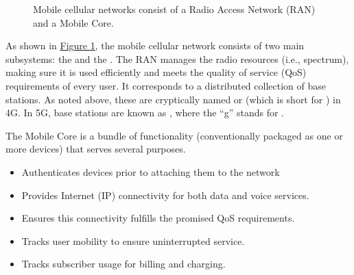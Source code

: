 \documentclass[a4paper,11pt,english]{sphinxmanual}
\let\sphinxpxdimen\pdfpxdimen\else\newdimen\sphinxpxdimen
\begin{document}
\begin{figure}[ht]
\centering
\capstart

\noindent\sphinxincludegraphics[width=600\sphinxpxdimen]{{Slide2}.png}
\caption{Mobile cellular networks consist of a Radio Access Network (RAN)
and a Mobile Core.}\label{\detokenize{arch:id3}}\label{\detokenize{arch:fig-cellular}}\end{figure}

\sphinxAtStartPar
As shown in \hyperref[\detokenize{arch:fig-cellular}]{Figure \ref{\detokenize{arch:fig-cellular}}}, the mobile cellular
network consists of two main subsystems: the  and the . The RAN manages the radio resources
(i.e., spectrum), making sure it is used efficiently and meets the
quality of service (QoS) requirements of every user. It corresponds
to a distributed collection of base stations. As noted above, these
are cryptically named  or  (which is short for ) in 4G. In 5G, base stations are known as , where the
“g” stands for .

\sphinxAtStartPar
The Mobile Core is a bundle of functionality (conventionally packaged
as one or more devices) that serves several purposes.
\begin{itemize}
\item {} 
\sphinxAtStartPar
Authenticates devices prior to attaching them to the network

\item {} 
\sphinxAtStartPar
Provides Internet (IP) connectivity for both data and voice services.

\item {} 
\sphinxAtStartPar
Ensures this connectivity fulfills the promised QoS requirements.

\item {} 
\sphinxAtStartPar
Tracks user mobility to ensure uninterrupted service.

\item {} 
\sphinxAtStartPar
Tracks subscriber usage for billing and charging.

\end{itemize}
\end{document}

